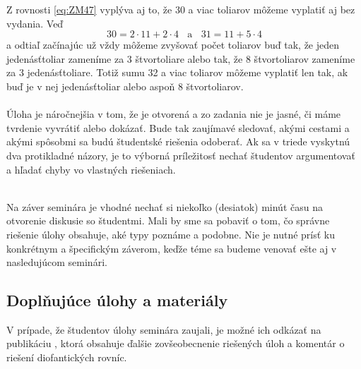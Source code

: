 {{Z rovnosti \ref{eq:ZM47} vyplýva aj to, že 30 a viac toliarov môžeme vyplatiť aj bez vydania. Veď 
$$30=2\cdot 11 +2\cdot 4 \ \ \ \ \text{a} \ \ \ \ 31=11+5\cdot 4$$
a odtiaľ začínajúc už vždy môžeme zvyšovať počet toliarov buď tak, že jeden jedenásťtoliar zameníme za 3 štvortoliare alebo tak, že 8 štvortoliarov zameníme za 3 jedenásťtoliare. Totiž sumu 32 a viac toliarov môžeme vyplatiť len tak, ak buď je v nej jedenásťtoliar alebo aspoň 8 štvortoliarov.\\
\\
\kom Úloha je náročnejšia v tom, že je otvorená a zo zadania nie je jasné, či máme tvrdenie vyvrátiť alebo dokázať. Bude tak zaujímavé sledovať, akými cestami a akými spôsobmi sa budú študentské riešenia odoberať. Ak sa v triede vyskytnú dva protikladné názory, je to výborná príležitosť nechať študentov argumentovať a hľadať chyby vo vlastných riešeniach.\\
\\
}

\kom Na záver seminára je vhodné nechať si niekoľko (desiatok) minút času na otvorenie diskusie so študentmi. Mali by sme sa pobaviť o tom, čo správne riešenie úlohy obsahuje, aké typy poznáme a podobne. Nie je nutné prísť ku konkrétnym a špecifickým záverom, keďže téme sa budeme venovať ešte aj v nasledujúcom seminári.

\subsection*{Doplňujúce úlohy a materiály}
V prípade, že študentov úlohy seminára zaujali, je možné ich odkázať na publikáciu \cite{ZM}, ktorá obsahuje ďalšie zovšeobecnenie riešených úloh a komentár o riešení diofantických rovníc.

}
